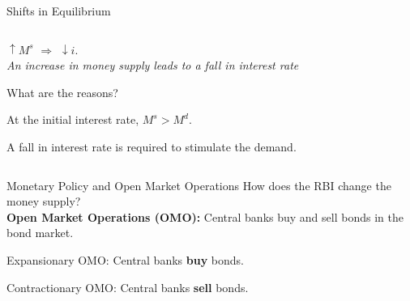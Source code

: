 \documentclass[shownotes,11pt, aspectratio=169]{beamer}
\newenvironment{wideitemize}{\itemize\addtolength{\itemsep}{10pt}}{\enditemize}
\begin{document}
\begin{frame}{Shifts in Equilibrium}
\begin{columns}[T] %
\begin{column}{.52\textwidth}
  \begin{wideitemize}
    \item $\uparrow M^s$ \pause $\Rightarrow$ $\downarrow i$. \\
      \textit{An increase in money supply leads to a fall in interest rate}
    \item What are the reasons? \pause
    \item At the initial interest rate, $M^s > M^d$. 
    \item A fall in interest rate is required to stimulate the demand. 
  \end{wideitemize}
\end{column}%
\pause
\hfill%
\begin{column}{.44\textwidth}
\end{column}%
\end{columns}
\end{frame}

\begin{frame}{Monetary Policy and Open Market Operations}
How does the RBI change the money supply?
\\ \pause
\vspace{5mm}
\textbf{Open Market Operations (OMO):} Central banks buy and sell bonds in the bond market.
\vspace{3mm}

\begin{wideitemize}
\item \textcolor{red!90}{Expansionary OMO}: Central banks \textbf{buy} bonds.
\item \textcolor{red!90}{Contractionary OMO}: Central banks \textbf{sell} bonds.
\end{wideitemize}
\end{frame}
\end{document}
